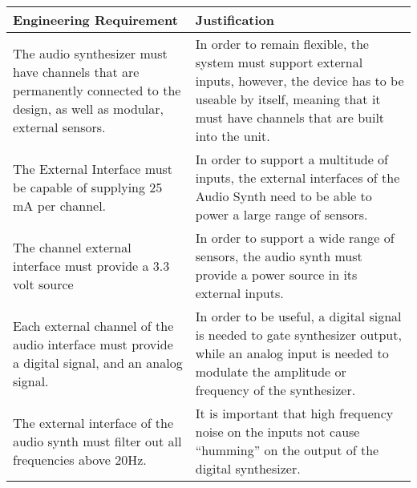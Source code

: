 \documentclass{article}
\begin{document}
\vspace {.3in}

\begin{tabular}{|p{3in}|p{3in}|}
\hline
Engineering Requirement & Justification \\
\hline

The audio synthesizer must have channels that are permanently
connected to the design, as well as modular, external sensors. & In
order to remain flexible, the system must support external inputs,
however, the device has to be useable by itself, meaning that it must
have channels that are built into the unit. \\

\hline

The External Interface must be capable of supplying 25 mA per channel.
& In order to support a multitude of inputs, the external interfaces
of the Audio Synth need to be able to power a large range of sensors.\\

\hline

The channel external interface must provide a 3.3 volt source & In
order to support a wide range of sensors, the audio synth must provide
a power source in its external inputs. \\

\hline

Each external channel of the audio interface must provide a digital
signal, and an analog signal. & In order to be useful, a digital
signal is needed to gate synthesizer output, while an analog input is
needed to modulate the amplitude or frequency of the synthesizer.\\

\hline 

The external interface of the audio synth must filter out all
frequencies above 20Hz. & It is important that high frequency noise on
the inputs not cause ``humming'' on the output of the digital
synthesizer.\\

\hline

\end{tabular}
\end{document}
